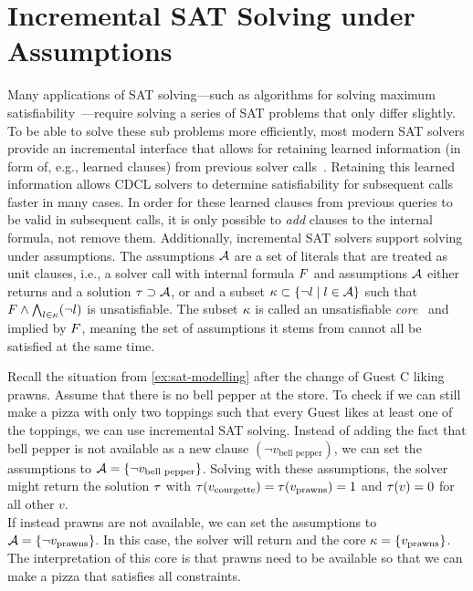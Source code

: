 \section{Incremental SAT Solving under Assumptions\label{sec:inc-sat}}

Many applications of SAT solving---such as algorithms for solving maximum satisfiability~\autocite{handbook2-maxsat}---require solving a series of SAT problems that only differ slightly.
To be able to solve these sub problems more efficiently, most modern SAT solvers provide an incremental interface that allows for retaining learned information (in form of, e.g., learned clauses) from previous solver calls~\autocites{DBLP:journals/entcs/EenS03,handbook2-cdcl}.
Retaining this learned information allows CDCL solvers to determine satisfiability for subsequent calls faster in many cases.
In order for these learned clauses from previous queries to be valid in subsequent calls, it is only possible to \emph{add} clauses to the internal formula, not remove them.
Additionally, incremental SAT solvers support solving under assumptions.
The assumptions $\mathcal{A}$ are a set of literals that are treated as unit clauses, i.e., a solver call with internal formula $F$ and assumptions $\mathcal{A}$ either returns \sat{} and a solution $\tau \supset \mathcal{A}$, or \unsat{} and a subset $\kappa \subset \{\lnot l \mid l\in\mathcal{A}\}$ such that $F \land \bigwedge_{l \in \kappa} (\lnot l)$ is unsatisfiable.
The subset $\kappa$ is called an unsatisfiable \emph{core}~\autocite{handbook2-cdcl} and implied by $F$, meaning the set of assumptions it stems from cannot all be satisfied at the same time.

\begin{example}\label{ex:inc-sat}
  Recall the situation from \cref{ex:sat-modelling} after the change of Guest C liking prawns.
  Assume that there is no bell pepper at the store.
  To check if we can still make a pizza with only two toppings such that every Guest likes at least one of the toppings, we can use incremental SAT solving.
  Instead of adding the fact that bell pepper is not available as a new clause $(\lnot v_\text{bell pepper})$, we can set the assumptions to $\mathcal{A}=\{\lnot v_\text{bell pepper}\}$.
  Solving with these assumptions, the solver might return the solution $\tau$ with $\tau(v_\text{courgette}) = \tau(v_\text{prawns}) = 1$ and $\tau(v) = 0$ for all other $v$. \\
  If instead prawns are not available, we can set the assumptions to $\mathcal{A}=\{\lnot v_\text{prawns}\}$.
  In this case, the solver will return \unsat{} and the core $\kappa=\{v_\text{prawns}\}$.
  The interpretation of this core is that prawns need to be available so that we can make a pizza that satisfies all constraints.
\end{example}

